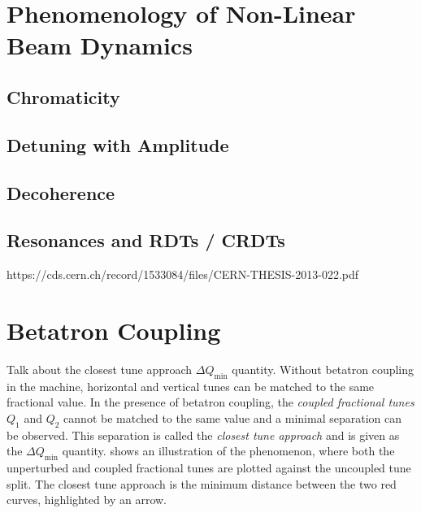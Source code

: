 \section{Phenomenology of Non-Linear Beam Dynamics}

\subsection{Chromaticity}

\subsection{Detuning with Amplitude}

\subsection{Decoherence}

\subsection{Resonances and RDTs / CRDTs}

https://cds.cern.ch/record/1533084/files/CERN-THESIS-2013-022.pdf


\section{Betatron Coupling}

Talk about the closest tune approach \(\Delta Q_{\mathrm{min}}\) quantity.
Without betatron coupling in the machine, horizontal and vertical tunes can be matched to the same fractional value.
In the presence of betatron coupling, the \emph{coupled fractional tunes} \(Q_1\) and \(Q_2\) cannot be matched to the same value and a minimal separation can be observed.
This separation is called the \emph{closest tune approach} and is given as the \(\Delta Q_{\mathrm{min}}\) quantity.
 shows an illustration of the phenomenon, where both the unperturbed and coupled fractional tunes are plotted against the uncoupled tune split.
The closest tune approach is the minimum distance between the two red curves, highlighted by an arrow.

